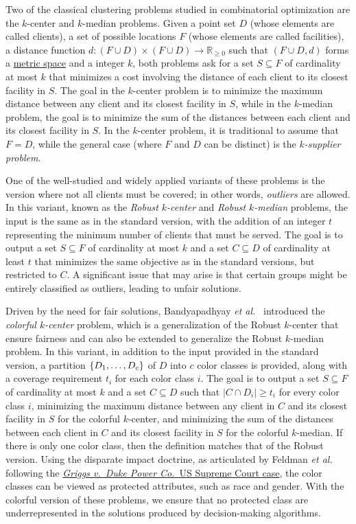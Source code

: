 \documentclass[12pt]{article}
\begin{document}
Two of the classical clustering problems studied in combinatorial optimization are the $k$-center and $k$-median problems. 
Given a point set $D$ (whose elements are called clients), a set of possible locations $F$ (whose elements are called facilities), a distance function $d : (F \cup D) \times (F \cup D) \rightarrow \mathbb{R}_{\geq 0}$ such that $(F\cup D, d)$ forms a \href{https://en.wikipedia.org/wiki/Metric_space}{metric space} and a integer $k$, both problems ask for a set $S \subseteq F$ of cardinality at most $k$ that minimizes a cost involving the distance of each client to its closest facility in $S$.
The goal in the $k$-center problem is to minimize the maximum distance between any client and its closest facility in $S$, while in the $k$-median problem, the goal is to minimize the sum of the distances between each client and its closest facility in $S$.
In the $k$-center problem, it is traditional to assume that $F=D$, while the general case (where $F$ and $D$ can be distinct) is the \emph{$k$-supplier problem}.

One of the well-studied and widely applied variants of these problems is the version where not all clients must be covered; in other words, \emph{outliers} are allowed. 
In this variant, known as the \emph{Robust $k$-center} and \emph{Robust $k$-median} problems, the input is the same as in the standard version, with the addition of an integer $t$ representing the minimum number of clients that must be served. 
The goal is to output a set $S \subseteq F$ of cardinality at most $k$ and a set $C \subseteq D$ of cardinality at least $t$ that minimizes the same objective as in the standard versions, but restricted to $C$. A significant issue that may arise is that certain groups might be entirely classified as outliers, leading to unfair solutions.

Driven by the need for fair solutions, Bandyapadhyay \emph{et al.}~\cite{BIPV2019} introduced the \emph{colorful $k$-center} problem, which is a generalization of the Robust $k$-center that ensure fairness and can also be extended to generalize the Robust $k$-median problem. 
In this variant, in addition to the input provided in the standard version, a partition $\{D_1,\ldots, D_c\}$ of $D$ into $c$ color classes is provided, along with a coverage requirement $t_i$  for each color class $i$. 
The goal is to output a set $S \subseteq F$ of cardinality at most $k$ and a set $C \subseteq D$ such that $|C \cap D_i| \geq t_i$ for every color class $i$, minimizing the maximum distance between any client in $C$ and its closest facility in $S$ for the colorful $k$-center, and minimizing the sum of the distances between each client in $C$ and its closest facility in $S$ for the colorful $k$-median.
If there is only one color class, then the definition matches that of the Robust version.
Using the disparate impact doctrine, as articulated by Feldman \emph{et al.}~\cite{FSMSV2015} following the \href{https://en.wikipedia.org/wiki/Griggs_v._Duke_Power_Co.}{\emph{Griggs v.\ Duke Power Co.}\ US Supreme Court case}, the color classes can be viewed as protected attributes, such as race and gender. 
With the colorful version of these problems, we ensure that no protected class are underrepresented in the solutions produced by decision-making algorithms.
\end{document}
